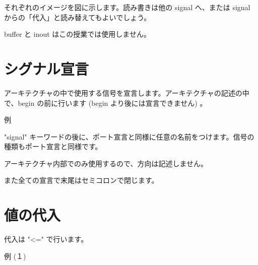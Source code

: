 \documentclass[letterpaper,10pt,dvipdfmx]{sphinxmanual}
\begin{document}
それぞれのイメージを図に示します。読み書きは他の signal へ、または signal からの「代入」と読み替えてもよいでしょう。

buffer と inout はこの授業では使用しません。

\begin{figure}[htbp]
\centering

\noindent{}
\end{figure}


\section{シグナル宣言}
\label{\detokenize{04_vhdl:id9}}
アーキテクチャの中で使用する信号を宣言します。アーキテクチャの記述の中で、begin の前に行います (begin より後には宣言できません) 。

例

\begin{sphinxVerbatim}[commandchars=\\\{\}]
   
     
   
   
\end{sphinxVerbatim}

"signal" キーワードの後に、ポート宣言と同様に任意の名前をつけます。信号の種類もポート宣言と同様です。

アーキテクチャ内部でのみ使用するので、方向は記述しません。

また全ての宣言で末尾はセミコロンで閉じます。


\section{値の代入}
\label{\detokenize{04_vhdl:id10}}
代入は "\textless{}=" で行います。

例 (１)

\begin{sphinxVerbatim}[commandchars=\\\{\}]
  
  
  
  
\end{sphinxVerbatim}
\end{document}
